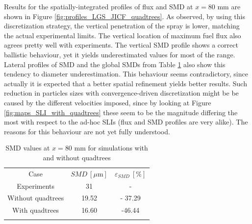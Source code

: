 Results for the spatially-integrated profiles of flux and SMD at $x = 80$ mm  are shown in Figure \ref{fig:profiles_LGS_JICF_quadtrees}. As observed, by using this discretization strategy, the vertical penetration of the spray is lower, matching the actual experimental limits. The vertical location of maximum fuel flux also agrees pretty well with experiments. The vertical SMD profile shows a correct ballistic behaviour, yet it yields underestimated values for most of the range. Lateral profiles of SMD and the global SMDs from Table \ref{tab:SMD_deviations_quadtrees} also show this tendency to diameter underestimation. This behaviour seems contradictory, since actually it is expected that a better spatial refinement yields better results. Such reduction in particles sizes with convergence-driven discretization might be be caused by the different velocities imposed, since by looking at Figure \ref{fig:maps_SLI_with_quadtrees} these seem to be the magnitude differing the most with respect to the ad-hoc SLIs (flux and SMD profiles are very alike). The reasons for this behaviour are not yet fully understood.  %

\begin{table}[!h]
\centering
\caption{SMD values at $x = 80$ mm for simulations with and without quadtrees}
\begin{tabular}{ccc}
\thickhline
Case & $SMD~\left[\mu \mathrm{m} \right]$ & $\varepsilon_{SMD}~\left[\% \right]$ \\
\thickhline
Experiments & 31 & - \\
Without quadtrees & 19.52 & - 37.29 \\
With quadtrees & 16.60 & -46.44 \\
\thickhline
\end{tabular}
\label{tab:SMD_deviations_quadtrees}
\end{table}


\clearpage



